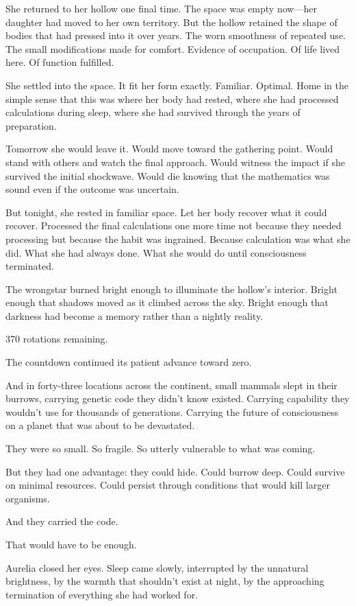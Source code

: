 She returned to her hollow one final time. The space was empty now—her daughter had moved to her own territory. But the hollow retained the shape of bodies that had pressed into it over years. The worn smoothness of repeated use. The small modifications made for comfort. Evidence of occupation. Of life lived here. Of function fulfilled.

She settled into the space. It fit her form exactly. Familiar. Optimal. Home in the simple sense that this was where her body had rested, where she had processed calculations during sleep, where she had survived through the years of preparation.

Tomorrow she would leave it. Would move toward the gathering point. Would stand with others and watch the final approach. Would witness the impact if she survived the initial shockwave. Would die knowing that the mathematics was sound even if the outcome was uncertain.

But tonight, she rested in familiar space. Let her body recover what it could recover. Processed the final calculations one more time not because they needed processing but because the habit was ingrained. Because calculation was what she did. What she had always done. What she would do until consciousness terminated.

The wrongstar burned bright enough to illuminate the hollow's interior. Bright enough that shadows moved as it climbed across the sky. Bright enough that darkness had become a memory rather than a nightly reality.

370 rotations remaining.

The countdown continued its patient advance toward zero.

And in forty-three locations across the continent, small mammals slept in their burrows, carrying genetic code they didn't know existed. Carrying capability they wouldn't use for thousands of generations. Carrying the future of consciousness on a planet that was about to be devastated.

They were so small. So fragile. So utterly vulnerable to what was coming.

But they had one advantage: they could hide. Could burrow deep. Could survive on minimal resources. Could persist through conditions that would kill larger organisms.

And they carried the code.

That would have to be enough.

Aurelia closed her eyes. Sleep came slowly, interrupted by the unnatural brightness, by the warmth that shouldn't exist at night, by the approaching termination of everything she had worked for.

